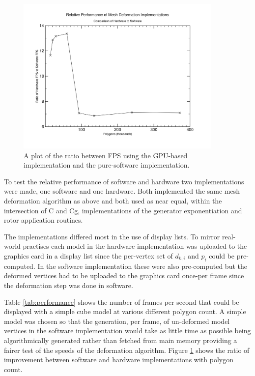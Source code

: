 \begin{figure}[p]
\centering
\includegraphics[width=0.9\textwidth]{performance}
\caption{\label{fig:performance}A plot of the ratio between FPS using the
GPU-based implementation and the pure-software implementation.}
\end{figure}

To test the relative performance of software and hardware two implementations
were made, one software and one hardware. Both implemented the same mesh deformation
algorithm as above and both used as near equal, within the intersection of C and
Cg, implementations of the generator exponentiation and rotor application
routines.

The implementations differed most in the use of display lists. To mirror real-world
practises each model in the hardware implementation was uploaded to the graphics
card in a display list since the per-vertex set of $d_{k,i}$ and $p_i$ could
be pre-computed. In the software implementation these were also pre-computed but the
deformed vertices had to be uploaded to the graphics card once-per frame since the
deformation step was done in software.

Table \ref{tab:performance} shows the number of frames per second that could be
displayed with a simple cube model at various different polygon count. A simple model
was chosen so that the generation, per frame, of un-deformed model vertices in the
software implementation would take as little time as possible being 
algorithmically generated rather than fetched from main memory providing a fairer
test of the speeds of the deformation algorithm. Figure \ref{fig:performance} shows
the ratio of improvement between software and hardware implementations with polygon
count.

